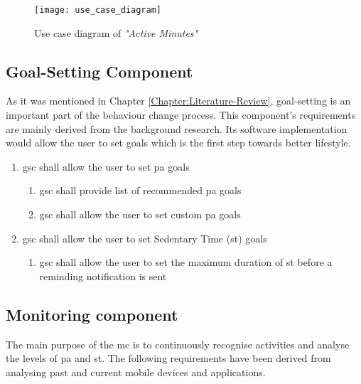     \begin{figure}
        \centering
        \texttt{[image: use\_case\_diagram]}
        \caption{Use case diagram of \textit{"Active Minutes"}}
        \label{fig:use-case-diagram}
    \end{figure}
    
    \subsection{Goal-Setting Component}
    As it was mentioned in Chapter \ref{Chapter:Literature-Review},  goal-setting is an important part of the behaviour change process. This component's requirements are mainly derived from the background research. Its software implementation would allow the user to set goals which is the first step towards better lifestyle.
    
    \begin{enumerate}
        \item \gls{gsc} shall allow the user to set \gls{pa} goals
        \begin{enumerate}
            \item \gls{gsc} shall provide list of recommended \gls{pa} goals
            \item \gls{gsc} shall allow the user to set custom \gls{pa} goals
        \end{enumerate}
        \item \gls{gsc} shall allow the user to set Sedentary Time (\gls{st}) goals
        \begin{enumerate}
            \item \gls{gsc} shall allow the user to set the maximum duration of \gls{st} before a reminding notification is sent 
        \end{enumerate}
    \end{enumerate}
    
    
    \subsection{Monitoring component}
    \label{subsection:monitoring-component}
    The main purpose of the \gls{mc} is to continuously recognise activities and analyse the levels of \gls{pa} and \gls{st}. The following requirements have been derived from analysing past and current mobile devices and applications.
    
